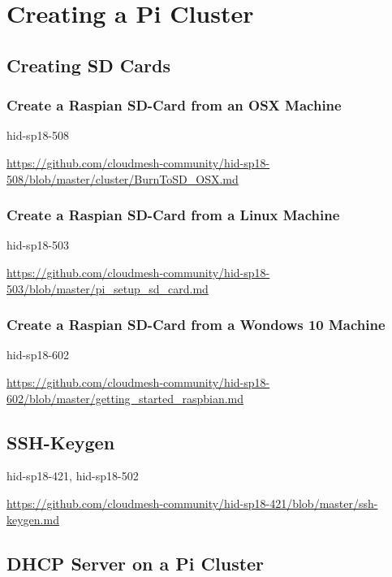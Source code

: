 \chapter{Creating a Pi Cluster}

\section{Creating SD Cards}

\subsection{Create a Raspian SD-Card from an OSX Machine}

hid-sp18-508

\url{https://github.com/cloudmesh-community/hid-sp18-508/blob/master/cluster/BurnToSD_OSX.md}

\immediate{}


\subsection{Create a Raspian SD-Card from a Linux Machine}

hid-sp18-503 

\url{https://github.com/cloudmesh-community/hid-sp18-503/blob/master/pi_setup_sd_card.md}

\subsection{Create a Raspian SD-Card from a Wondows 10 Machine}

hid-sp18-602

\url{https://github.com/cloudmesh-community/hid-sp18-602/blob/master/getting_started_raspbian.md}


\section{SSH-Keygen}

hid-sp18-421, hid-sp18-502

\url{https://github.com/cloudmesh-community/hid-sp18-421/blob/master/ssh-keygen.md}

\section{DHCP Server on a Pi Cluster}

